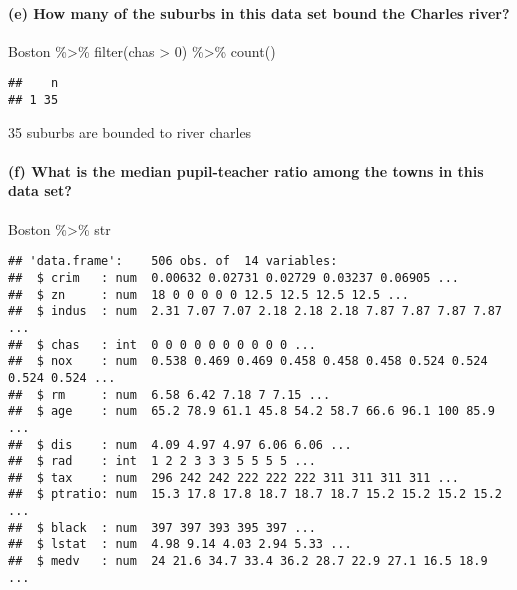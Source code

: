 \documentclass[
]{article}
\newenvironment{Shaded}{\begin{snugshade}}{\end{snugshade}}
\newcommand{\DecValTok}[1]{\textcolor[rgb]{0.00,0.00,0.81}{#1}}
\newcommand{\FunctionTok}[1]{\textcolor[rgb]{0.00,0.00,0.00}{#1}}
\newcommand{\NormalTok}[1]{#1}
\newcommand{\SpecialCharTok}[1]{\textcolor[rgb]{0.00,0.00,0.00}{#1}}
\begin{document}
\hypertarget{e-how-many-of-the-suburbs-in-this-data-set-bound-the-charles-river}{%
\paragraph{(e) How many of the suburbs in this data set bound the
Charles
river?}\label{e-how-many-of-the-suburbs-in-this-data-set-bound-the-charles-river}}

\begin{Shaded}
\begin{Highlighting}[]
\NormalTok{Boston }\SpecialCharTok{\%\textgreater{}\%} \FunctionTok{filter}\NormalTok{(chas }\SpecialCharTok{\textgreater{}} \DecValTok{0}\NormalTok{) }\SpecialCharTok{\%\textgreater{}\%} \FunctionTok{count}\NormalTok{()}
\end{Highlighting}
\end{Shaded}

\begin{verbatim}
##    n
## 1 35
\end{verbatim}

35 suburbs are bounded to river charles

\hypertarget{f-what-is-the-median-pupil-teacher-ratio-among-the-towns-in-this-data-set}{%
\paragraph{(f) What is the median pupil-teacher ratio among the towns in
this data
set?}\label{f-what-is-the-median-pupil-teacher-ratio-among-the-towns-in-this-data-set}}

\begin{Shaded}
\begin{Highlighting}[]
\NormalTok{Boston }\SpecialCharTok{\%\textgreater{}\%}\NormalTok{ str}
\end{Highlighting}
\end{Shaded}

\begin{verbatim}
## 'data.frame':    506 obs. of  14 variables:
##  $ crim   : num  0.00632 0.02731 0.02729 0.03237 0.06905 ...
##  $ zn     : num  18 0 0 0 0 0 12.5 12.5 12.5 12.5 ...
##  $ indus  : num  2.31 7.07 7.07 2.18 2.18 2.18 7.87 7.87 7.87 7.87 ...
##  $ chas   : int  0 0 0 0 0 0 0 0 0 0 ...
##  $ nox    : num  0.538 0.469 0.469 0.458 0.458 0.458 0.524 0.524 0.524 0.524 ...
##  $ rm     : num  6.58 6.42 7.18 7 7.15 ...
##  $ age    : num  65.2 78.9 61.1 45.8 54.2 58.7 66.6 96.1 100 85.9 ...
##  $ dis    : num  4.09 4.97 4.97 6.06 6.06 ...
##  $ rad    : int  1 2 2 3 3 3 5 5 5 5 ...
##  $ tax    : num  296 242 242 222 222 222 311 311 311 311 ...
##  $ ptratio: num  15.3 17.8 17.8 18.7 18.7 18.7 15.2 15.2 15.2 15.2 ...
##  $ black  : num  397 397 393 395 397 ...
##  $ lstat  : num  4.98 9.14 4.03 2.94 5.33 ...
##  $ medv   : num  24 21.6 34.7 33.4 36.2 28.7 22.9 27.1 16.5 18.9 ...
\end{verbatim}
\end{document}
